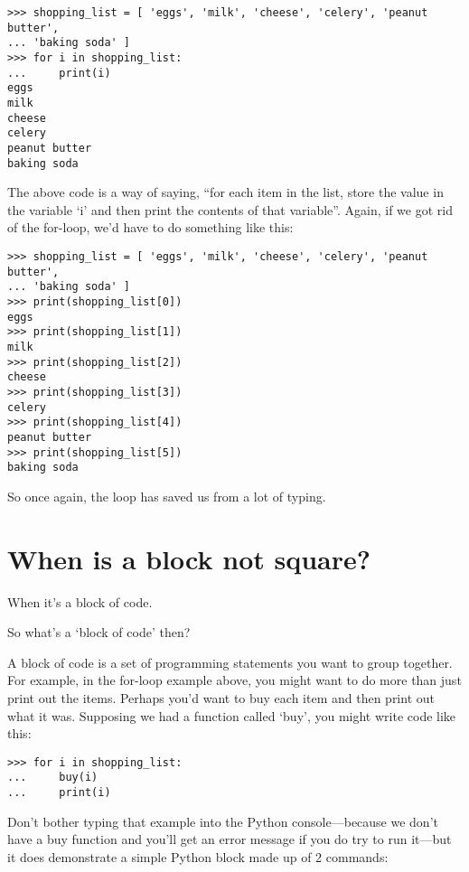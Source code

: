 \begin{listing}
\begin{verbatim}
>>> shopping_list = [ 'eggs', 'milk', 'cheese', 'celery', 'peanut butter', 
... 'baking soda' ]
>>> for i in shopping_list:
...     print(i)
eggs
milk
cheese
celery
peanut butter
baking soda
\end{verbatim}
\end{listing}

The above code is a way of saying, ``for each item in the list, store the value in the variable `i' and then print the contents of that variable''.  Again, if we got rid of the for-loop, we'd have to do something like this:

\begin{listing}
\begin{verbatim}
>>> shopping_list = [ 'eggs', 'milk', 'cheese', 'celery', 'peanut butter', 
... 'baking soda' ]
>>> print(shopping_list[0])
eggs
>>> print(shopping_list[1])
milk
>>> print(shopping_list[2])
cheese
>>> print(shopping_list[3])
celery
>>> print(shopping_list[4])
peanut butter
>>> print(shopping_list[5])
baking soda
\end{verbatim}
\end{listing}

So once again, the loop has saved us from a lot of typing.

\section{When is a block not square?}

When it's a block of code.
\par
\noindent
So what's a `block of code' then?
\par
A block of code is a set of programming statements you want to group together.  For example, in the for-loop example above, you might want to do more than just print out the items.  Perhaps you'd want to buy each item and then print out what it was.  Supposing we had a function called `buy', you might write code like this:

\begin{listingignore}
\begin{verbatim}
>>> for i in shopping_list:
...     buy(i)
...     print(i)
\end{verbatim}
\end{listingignore}

Don't bother typing that example into the Python console---because we don't have a buy function and you'll get an error message if you do try to run it---but it does demonstrate a simple Python block made up of 2 commands:

